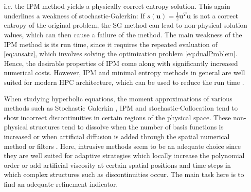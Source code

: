 i.e. the IPM method yields a physically correct entropy solution. This again underlines a weakness of stochastic-Galerkin: If $s(\bm{u}) = \frac{1}{2}\bm{u}^T\bm{u}$ is not a correct entropy of the original problem, the SG method can lead to non-physical solution values, which can then cause a failure of the method. The main weakness of the IPM method is its run time, since it requires the repeated evaluation of \eqref{eq:ansatz}, which involves solving the optimization problem \eqref{eq:dualProblem}. Hence, the desirable properties of IPM come along with significantly increased numerical costs. However, IPM and minimal entropy methods in general are well suited for modern HPC architecture, which can be used to reduce the run time \cite{garrett2015optimization}. 

When studying hyperbolic equations, the moment approximations of various methods such as Stochastic Galerkin \cite{le2004uncertainty}, IPM \cite{kusch2018filtered} and stochastic-Collocation \cite{barth2013non,dwight2013adaptive} tend to show incorrect discontinuities in certain regions of the physical space. These non-physical structures tend to dissolve when the number of basis functions is increased \cite{pettersson2009numerical,offner2017stability} or when artificial diffusion is added through the spatial numerical method \cite{offner2017stability} or filters \cite{kusch2018filtered}. Here, intrusive methods seem to be an adequate choice since they are well suited for adaptive strategies which locally increase the polynomial order \cite{tryoen2012adaptive,kroker2012finite,giesselmann2017posteriori} or add artificial viscosity \cite{kusch2018filtered} at certain spatial positions and time steps in which complex structures such as discontinuities occur. The main task here is to find an adequate refinement indicator. \\

